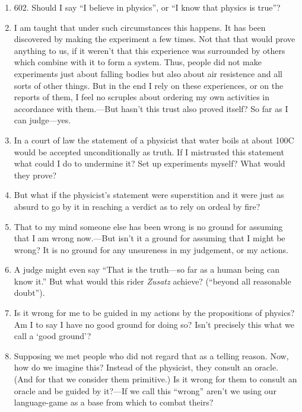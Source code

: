 \documentclass{book}
\begin{document}
\begin{enumerate}
\item

602.
Should I say ``I believe in physics'', or ``I know that physics is true''?

\item
I am taught that under such circumstances this happens. It has been discovered
by making the experiment a few times. Not that that would prove anything to us,
if it weren't that this experience was surrounded by others which combine with
it to form a system. Thus, people did not make experiments just about falling
bodies but also about air resistence and all sorts of other things.  But in the
end I rely on these experiences, or on the reports of them, I feel no scruples
about ordering my own activities in accordance with them.---But hasn't this
trust also proved itself? So far as I can judge---yes.

\item
In a court of law the statement of a physicist that water boils at about 100C
would be accepted unconditionally as truth.  If I mistrusted this statement
what could I do to undermine it? Set up experiments myself? What would they
prove?

\item
But what if the physicist's statement were superstition and it were just as
absurd to go by it in reaching a verdict as to rely on ordeal by fire?

\item
That to my mind someone else has been wrong is no ground for assuming that I am
wrong now.---But isn't it a ground for assuming that I might be wrong? It is no
ground for any unsureness in my judgement, or my actions.

\item
A judge might even say ``That is the truth---so far as a human being can know
it.'' But what would this rider \emph{Zusatz} achieve? (``beyond all reasonable
doubt'').

\item
Is it wrong for me to be guided in my actions by the propositions of physics?
Am I to say I have no good ground for doing so? Isn't precisely this what we
call a `good ground'?

\item
Supposing we met people who did not regard that as a telling reason. Now, how
do we imagine this? Instead of the physicist, they consult an oracle. (And for
that we consider them primitive.) Is it wrong for them to consult an oracle and
be guided by it?---If we call this ``wrong'' aren't we using our language-game
as a base from which to combat theirs?


\end{enumerate}
\end{document}

